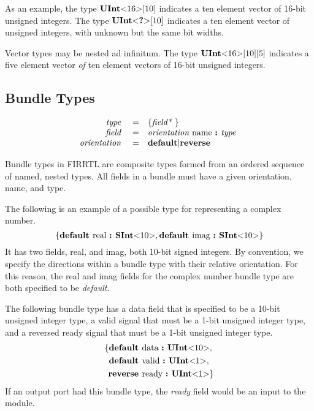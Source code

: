 \documentclass[12pt]{article}
\begin{document}
As an example, the type $\text{\bf UInt}\text{\bf $<$} 16 \text{\bf $>$}[10]$ indicates a ten element vector of 16-bit unsigned integers.
The type $\text{\bf UInt}\text{\bf $<$} \text{\bf ?} \text{\bf $>$}[10]$ indicates a ten element vector of unsigned integers, with unknown but the same bit widths.

Vector types may be nested ad infinitum.
The type $\text{\bf UInt}\text{\bf $<$} 16 \text{\bf $>$}[10][5]$ indicates a five element vector {\em of} ten element vectors of 16-bit unsigned integers.

\subsection{Bundle Types}
\[
\begin{array}{rrl}
\text{\em type\ }       &=     &\{\text{\em field*\ }\}                         \\
\text{\em field\ }      &=     &\text{\em orientation\ } \text{name } \text{\bf :\ } \text{\em type\ }        \\
\text{\em orientation\ }&=     &\text{\bf default} \vert \text{\bf reverse}    \\ 
\end{array}
\]

Bundle types in FIRRTL are composite types formed from an ordered sequence of named, nested types.
All fields in a bundle must have a given orientation, name, and type.

The following is an example of a possible type for representing a complex number.
\[
\{\text{\bf default\ } \text{real } \text{\bf :\ } \text{\bf SInt}\text{\bf $<$} 10 \text{\bf $>$},
         \text{\bf default\ } \text{imag } \text{\bf :\ } \text{\bf SInt}\text{\bf $<$} 10 \text{\bf $>$}\}
\]
It has two fields, real, and imag, both 10-bit signed integers.
By convention, we specify the directions within a bundle type with their relative orientation.
For this reason, the real and imag fields for the complex number bundle type are both specified to be {\em default}.

The following bundle type has a data field that is specified to be a 10-bit unsigned integer type, a valid signal that must be a 1-bit unsigned integer type, and a reversed ready signal that must be a 1-bit unsigned integer type.
\[
\begin{aligned}
\{ \text{\bf default\ } &\text{data } \text{\bf :\ } \text{\bf UInt}\text{\bf $<$} 10 \text{\bf $>$}, \\
   \text{\bf default\ } &\text{valid } \text{\bf :\ } \text{\bf UInt}\text{\bf $<$} 1 \text{\bf $>$}, \\
   \text{\bf reverse\ } &\text{ready } \text{\bf :\ } \text{\bf UInt}\text{\bf $<$} 1 \text{\bf $>$}\} \\
\end{aligned}
\]
If an output port had this bundle type, the {\em ready} field would be an input to the module.
\end{document}
